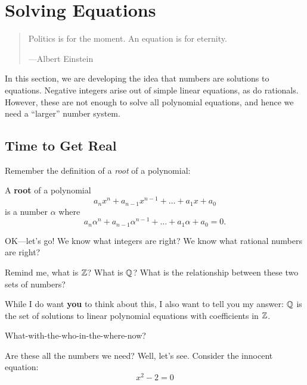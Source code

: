 \chapter{Solving Equations}


\begin{quote}

Politics is for the moment. An equation is for eternity.

\hfill---Albert Einstein
\end{quote}


\begin{teachingnote}
In this section, we are developing the idea that numbers are solutions
to equations. Negative integers arise out of simple linear equations,
as do rationals. However, these are not enough to solve all polynomial
equations, and hence we need a ``larger'' number system.
\end{teachingnote}


\section{Time to Get Real}

Remember the definition of a \textit{root} of a polynomial:

\begin{definition} A \textbf{root} of a polynomial 
\[
a_nx^n + a_{n-1}x^{n-1} + \dots + a_1 x + a_0
\]
is a number $\alpha$ where
\[
a_n\alpha^n + a_{n-1}\alpha^{n-1} + \dots + a_1 \alpha + a_0 = 0.
\]
\end{definition}


OK---let's go! We know what integers are right? We know what rational
numbers are right?

\begin{question}
Remind me, what is $\mathbb Z$? What is $\mathbb Q$? What is the relationship between
these two sets of numbers?
\end{question}
While I do want \textbf{you} to think about this, I also want to tell
you my answer: $\mathbb Q$ is the set of solutions to linear polynomial
equations with coefficients in $\mathbb Z$.

\begin{question}
What-with-the-who-in-the-where-now?
\end{question}
\QM

Are these all the numbers we need? Well, let's see. Consider the
innocent equation:
\[
x^2 -2 = 0
\]

